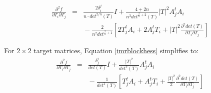 \documentclass{report}
\begin{document}
\begin{eqnarray} \label{imrblockhess}
\frac{\partial^2 f}{\partial T_i \partial T_j} 
&=& \frac{2 \delta_i^j}{n \cdot det^{2/n}(T)} I
+ \frac{4 + 2n}{n^3 det^{\frac{2}{n}+2}(T)} |T|^2 A_j^t A_i \\ \nonumber
& & {} - \frac{2}{n^2 det^{\frac{2}{n}+1}} \left[ 
2 T_j^t A_i + 2 A_j^t T_i + |T|^2 \frac{\partial^2 det(T)}{\partial T_i \partial T_j} \right]
\end{eqnarray}



\noindent For $2 \times 2$ target matrices, Equation \ref{imrblockhess} simplifies to:
\begin{eqnarray}
\frac{\partial^2 f}{\partial T_i \partial T_j}
&=& \frac{\delta^i_j}{det(T)}I + \frac{|T|^2}{det^3(T)} A_j^t A_i \\ \nonumber
& & {} - \frac{1}{det^2(T)} \left[ T_j^t A_i + A_j^t T_i 
+ \frac{|T|^2}{2} \frac{\partial^2 det(T)}{\partial T_i \partial T_j} \right]
\end{eqnarray}
\end{document}
